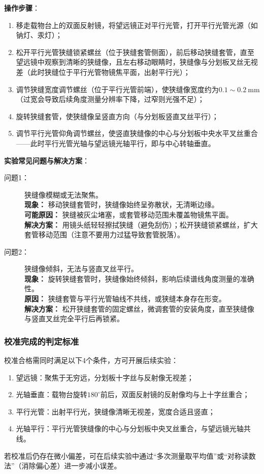 \documentclass[11pt]{article}
\begin{document}
\textbf{操作步骤}：
\begin{enumerate}[label=(\arabic*), itemsep=0.5ex]
    \item 移走载物台上的双面反射镜，将望远镜正对平行光管，打开平行光管光源（如钠灯、汞灯）；
    \item 松开平行光管狭缝锁紧螺丝（位于狭缝套管侧面），前后移动狭缝套管，直至望远镜中观察到清晰的狭缝像，且左右移动眼睛时，狭缝像与分划板叉丝无视差（此时狭缝位于平行光管物镜焦平面，出射平行光）；
    \item 调节狭缝宽度调节螺丝（位于平行光管前端），使狭缝像宽度约为$0.1\sim0.2\ \text{mm}$（过宽会导致后续角度测量分辨率下降，过窄则光强不足）；
    \item 旋转狭缝套管，使狭缝像呈竖直方向（与分划板竖直叉丝平行）；
    \item 调节平行光管仰角调节螺丝，使竖直狭缝像的中心与分划板中央水平叉丝重合——此时平行光管光轴与望远镜光轴平行，即与中心转轴垂直。
\end{enumerate}

\textbf{实验常见问题与解决方案}：
\begin{description}
    \item[问题1：] 狭缝像模糊或无法聚焦。\\
    \textbf{现象：} 移动狭缝套管时，狭缝像始终呈弥散状，无清晰边缘。\\
    \textbf{可能原因：} 狭缝被灰尘堵塞，或套管移动范围未覆盖物镜焦平面。\\
    \textbf{解决方案：} 用镜头纸轻轻擦拭狭缝（避免刮伤）；松开狭缝锁紧螺丝，扩大套管移动范围（注意不要用力过猛导致套管脱落）。
    
    \item[问题2：] 狭缝像倾斜，无法与竖直叉丝平行。\\
    \textbf{现象：} 旋转狭缝套管时，狭缝像始终倾斜，影响后续谱线角度测量的准确性。\\
    \textbf{原因：} 狭缝套管与平行光管轴线不共线，或狭缝本身存在形变。\\
    \textbf{解决方案：} 松开狭缝套管的固定螺丝，微调套管的安装角度，直至狭缝像与竖直叉丝完全平行后再锁紧。
\end{description}

\subsubsection{校准完成的判定标准}
校准合格需同时满足以下4个条件，方可开展后续实验：
\begin{enumerate}[label=(\arabic*), itemsep=0.3ex]
    \item 望远镜：聚焦于无穷远，分划板十字丝与反射像无视差；
    \item 光轴垂直：载物台旋转$180^\circ$前后，双面反射镜的反射像均与上十字丝重合；
    \item 平行光管：出射平行光，狭缝像清晰无视差，宽度合适且竖直；
    \item 光轴平行：平行光管狭缝像的中心与分划板中央叉丝重合，与望远镜光轴共线。
\end{enumerate}
若校准后仍存在微小偏差，可在后续实验中通过“多次测量取平均值”或“对称读数法”（消除偏心差）进一步减小误差。
\end{document}

